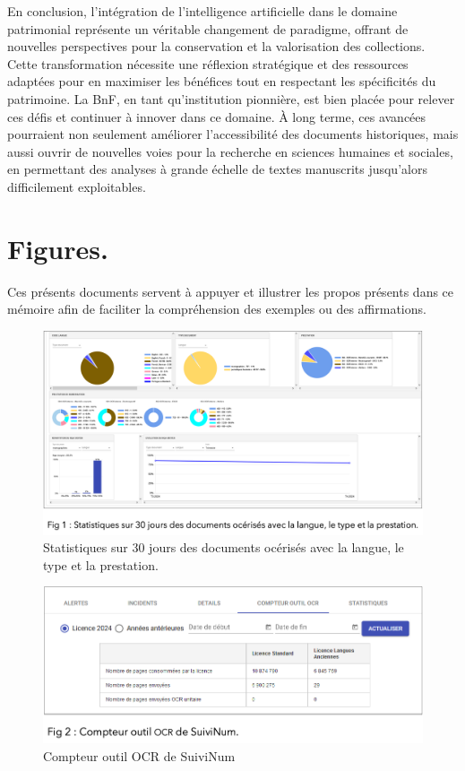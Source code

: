 \documentclass[a4paper,12pt,twoside]{book}
\begin{document}
	En conclusion, l'intégration de l'intelligence artificielle dans le domaine patrimonial représente un véritable changement de paradigme, offrant de nouvelles perspectives pour la conservation et la valorisation des collections. Cette transformation nécessite une réflexion stratégique et des ressources adaptées pour en maximiser les bénéfices tout en respectant les spécificités du patrimoine. La BnF, en tant qu'institution pionnière, est bien placée pour relever ces défis et continuer à innover dans ce domaine. À long terme, ces avancées pourraient non seulement améliorer l'accessibilité des documents historiques, mais aussi ouvrir de nouvelles voies pour la recherche en sciences humaines et sociales, en permettant des analyses à grande échelle de textes manuscrits jusqu'alors difficilement exploitables.
	
	
	
\newpage{\pagestyle{empty}\cleardoublepage}








\appendix %
\chapter{Figures.}
Ces présents documents servent à appuyer et illustrer les propos présents dans ce mémoire afin de faciliter la compréhension des exemples ou des affirmations.

\begin{figure}
	\centering
	\includegraphics[width=0.7\linewidth]{images/stat_suivinum}
	\caption{Statistiques sur 30 jours des documents océrisés avec la langue, le type et la prestation.}
	\label{fig:statsuivinum}
\end{figure}

\begin{figure}
	\centering
	\includegraphics[width=0.7\linewidth]{images/compteur_ocr}
	\caption{Compteur outil OCR de SuiviNum}
	\label{fig:compteurocr}
\end{figure}
\end{document}
